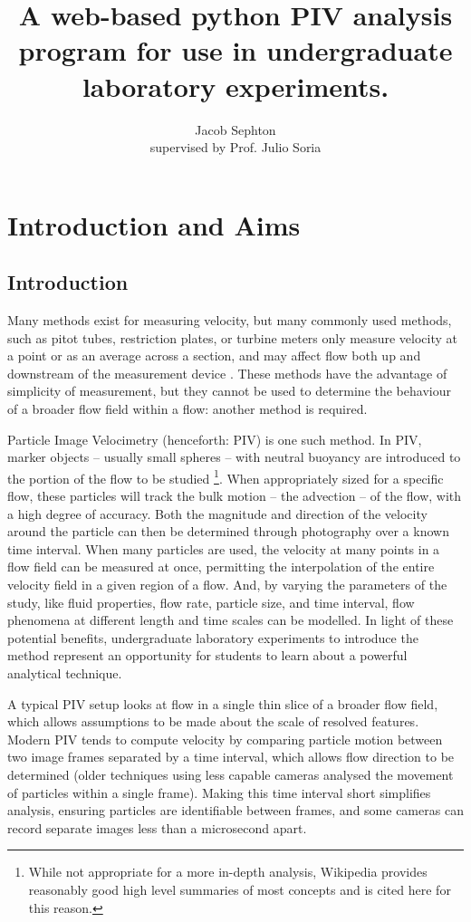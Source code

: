 \documentclass[12pt, a4paper]{amsart}
\title{A web-based python PIV analysis program for use in undergraduate laboratory experiments.}
\author{Jacob Sephton\\ supervised by Prof. Julio Soria}
\begin{document}
\maketitle

\section{Introduction and Aims}
\subsection{Introduction}
Many methods exist for measuring velocity, but many commonly used methods, such as pitot tubes, restriction plates, or turbine meters only measure velocity at a point or as an average across a section, and may affect flow both up and downstream of the measurement device \cite[pp. 109, 469]{munson}. These methods have the advantage of simplicity of measurement, but they cannot be used to determine the behaviour of a broader flow field within a flow: another method is required. 

Particle Image Velocimetry (henceforth: PIV) is one such method. In PIV, marker objects -- usually small spheres -- with neutral buoyancy are introduced to the portion of the flow to be studied \cite{wikipiv}\footnote{While not appropriate for a more in-depth analysis, Wikipedia provides reasonably good high level summaries of most concepts and is cited here for this reason.}. When appropriately sized for a specific flow, these particles will track the bulk motion -- the advection -- of the flow, with a high degree of accuracy. Both the magnitude and direction of the velocity around the particle can then be determined through photography over a known time interval. When many particles are used, the velocity at many points in a flow field can be measured at once, permitting the interpolation of the entire velocity field in a given region of a flow. And, by varying the parameters of the study, like fluid properties, flow rate, particle size, and time interval, flow phenomena at different length and time scales can be modelled. In light of these potential benefits, undergraduate laboratory experiments to introduce the method represent an opportunity for students to learn about a powerful analytical technique. 

A typical PIV setup looks at flow in a single thin slice of a broader flow field, which allows assumptions to be made about the scale of resolved features. Modern PIV tends to compute velocity by comparing particle motion between two image frames separated by a time interval, which allows flow direction to be determined (older techniques using less capable cameras analysed the movement of particles within a single frame). Making this time interval short simplifies analysis, ensuring particles are identifiable between frames, and some cameras can record separate images less than a microsecond apart.
\end{document}
